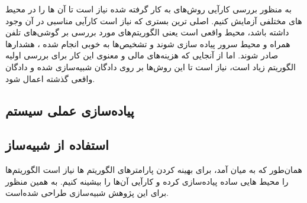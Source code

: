 
به منظور بررسی کارآیی روش‌های به کار گرفته شده نیاز است تا آن ها را در محیط های مختلفی آزمایش کنیم. اصلی ترین بستری که نیاز است کارآیی مناسبی در آن وجود داشته باشد، محیط واقعی است یعنی الگوریتم‌های مورد بررسی بر گوشی‌های تلفن همراه و محیط سرور پیاده سازی شوند و تشخیص‌ها به خوبی انجام شده ، هشدارها صادر شوند. اما از آنجایی که هزینه‌های مالی و معنوی این کار برای بررسی اولیه الگوریتم زیاد است، نیاز است تا این روش‌ها بر روی دادگان شبیه‌سازی شده و دادگان واقعی گذشته اعمال شود.


\subsection{پیاده‌سازی عملی سیستم}


\subsection{ استفاده از شبیه‌ساز }
همان‌طور که به میان آمد، برای بهینه کردن پارامترهای الگوریتم ها نیاز است الگوریتم‌ها را محیط هایی ساده پیاده‌سازی کرده و کارآیی آن‌ها را بیشینه کنیم. به همین منظور برای این پژوهش شبیه‌سازی طراحی شده‌است.

